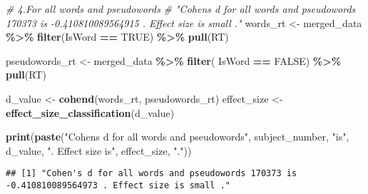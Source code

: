 \documentclass[
]{article}
\newenvironment{Shaded}{\begin{snugshade}}{\end{snugshade}}
\newcommand{\CommentTok}[1]{\textcolor[rgb]{0.56,0.35,0.01}{\textit{#1}}}
\newcommand{\ConstantTok}[1]{\textcolor[rgb]{0.56,0.35,0.01}{#1}}
\newcommand{\FunctionTok}[1]{\textcolor[rgb]{0.13,0.29,0.53}{\textbf{#1}}}
\newcommand{\NormalTok}[1]{#1}
\newcommand{\OtherTok}[1]{\textcolor[rgb]{0.56,0.35,0.01}{#1}}
\newcommand{\SpecialCharTok}[1]{\textcolor[rgb]{0.81,0.36,0.00}{\textbf{#1}}}
\newcommand{\StringTok}[1]{\textcolor[rgb]{0.31,0.60,0.02}{#1}}
\begin{document}
\begin{Shaded}
\begin{Highlighting}[]
\CommentTok{\# 4.For all words and pseudowords}
\CommentTok{\# "Cohen\textquotesingle{}s d for all words and pseudowords 170373 is {-}0.410810089564915 . Effect size is small ."}
\NormalTok{words\_rt }\OtherTok{\textless{}{-}}\NormalTok{ merged\_data }\SpecialCharTok{\%\textgreater{}\%}
  \FunctionTok{filter}\NormalTok{(IsWord }\SpecialCharTok{==} \ConstantTok{TRUE}\NormalTok{) }\SpecialCharTok{\%\textgreater{}\%}
  \FunctionTok{pull}\NormalTok{(RT)}

\NormalTok{pseudowords\_rt }\OtherTok{\textless{}{-}}\NormalTok{ merged\_data }\SpecialCharTok{\%\textgreater{}\%}
  \FunctionTok{filter}\NormalTok{( IsWord }\SpecialCharTok{==} \ConstantTok{FALSE}\NormalTok{) }\SpecialCharTok{\%\textgreater{}\%}
  \FunctionTok{pull}\NormalTok{(RT)}

\NormalTok{d\_value }\OtherTok{\textless{}{-}} \FunctionTok{cohend}\NormalTok{(words\_rt, pseudowords\_rt)}
\NormalTok{effect\_size }\OtherTok{\textless{}{-}} \FunctionTok{effect\_size\_classification}\NormalTok{(d\_value)}

\FunctionTok{print}\NormalTok{(}\FunctionTok{paste}\NormalTok{(}\StringTok{"Cohen\textquotesingle{}s d for all words and pseudowords"}\NormalTok{, subject\_number, }\StringTok{"is"}\NormalTok{, d\_value, }\StringTok{". Effect size is"}\NormalTok{, effect\_size, }\StringTok{"."}\NormalTok{))}
\end{Highlighting}
\end{Shaded}

\begin{verbatim}
## [1] "Cohen's d for all words and pseudowords 170373 is -0.410810089564973 . Effect size is small ."
\end{verbatim}
\end{document}
